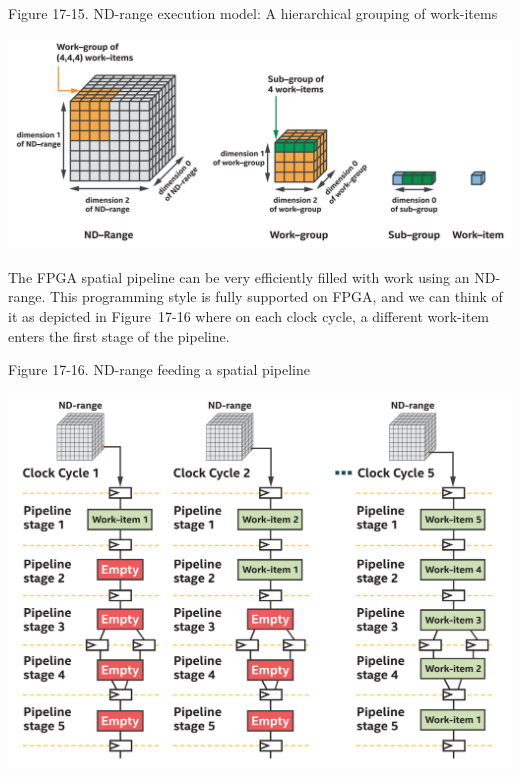 \hspace*{\fill} \par %
Figure 17-15. ND-range execution model: A hierarchical grouping of work-items
\begin{center}
	\includegraphics[width=1.0\textwidth]{content/chapter-17/images/14}
\end{center}

The FPGA spatial pipeline can be very efficiently filled with work using an ND-range. This programming style is fully supported on FPGA, and we can think of it as depicted in Figure 17-16 where on each clock cycle, a different work-item enters the first stage of the pipeline.\par

\hspace*{\fill} \par %
Figure 17-16. ND-range feeding a spatial pipeline
\begin{center}
	\includegraphics[width=1.0\textwidth]{content/chapter-17/images/15}
\end{center}

